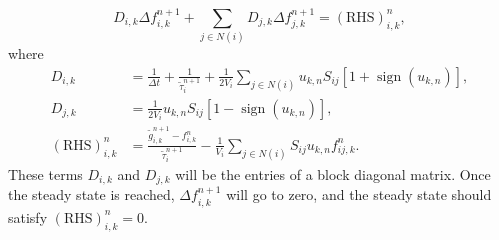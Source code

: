 \documentclass[3p,12pt]{elsarticle}
\begin{document}
	\begin{equation}
		D_{i,k} \Delta f_{i,k}^{n+1} + \sum_{j \in {N(i)}}D_{j,k}\Delta f_{j,k}^{n+1} = (\text{RHS})_{i,k}^n,
		\label{linear}\end{equation}
	where
	\begin{equation}
		\begin{aligned}
			D_{i, k} &=\frac{1}{\Delta t} + \frac{1}{\tilde{\tau}_{i}^{n+1}}+\frac{1}{2V_i} \sum_{j \in N(i)} u_{k, n} S_{i j}\left[1+\operatorname{sign}\left(u_{k, n}\right)\right], \\ D_{j, k} &=\frac{1}{2V_i} u_{k, n} S_{i j}\left[1-\operatorname{sign}\left(u_{k, n}\right)\right], \\ (\text{RHS})_{i,k}^n &= \frac{\tilde{g}_{i, k}^{n+1}-f_{i, k}^{n}}{\tilde{\tau}_{i}^{n+1}}-\frac{1}{V_i}\sum_{j \in N(i)} S_{i j} u_{k, n} f_{i j, k}^{n}.
		\end{aligned}
	\end{equation}
	These terms $D_{i,k}$ and $D_{j,k}$ will be the entries of a block diagonal matrix. Once the steady state is reached, $\Delta f_{i,k}^{n+1}$ will go to zero, and the steady state should satisfy $(\text{RHS})_{i,k}^n = 0$.
	
\end{document}
